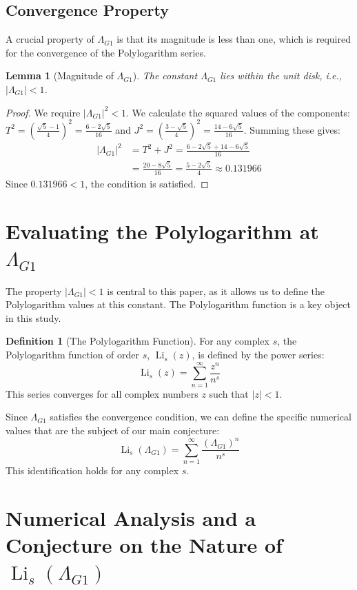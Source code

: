 \documentclass{amsart}
\theoremstyle{plain}
\newtheorem{lemma}[theorem]{Lemma}
\theoremstyle{definition}
\newtheorem{definition}[theorem]{Definition}
\theoremstyle{remark}
\DeclareMathOperator{\Li}{Li}
\newcommand{\LambdaG}{\Lambda_{G1}}
\begin{document}
\subsection{Convergence Property}
A crucial property of $\LambdaG$ is that its magnitude is less than one, which is required for the convergence of the Polylogarithm series.
\begin{lemma}[Magnitude of $\LambdaG$]
\label{lem:convergence}
The constant $\LambdaG$ lies within the unit disk, i.e., $|\LambdaG| < 1$.
\end{lemma}
\begin{proof}
We require $|\LambdaG|^2 < 1$. We calculate the squared values of the components: $T^2 = \left(\frac{\sqrt{5}-1}{4}\right)^2 = \frac{6-2\sqrt{5}}{16}$ and $J^2 = \left(\frac{3-\sqrt{5}}{4}\right)^2 = \frac{14-6\sqrt{5}}{16}$. Summing these gives:
\begin{align*}
    |\LambdaG|^2 &= T^2+J^2 = \frac{6-2\sqrt{5} + 14-6\sqrt{5}}{16} \\
                 &= \frac{20-8\sqrt{5}}{16} = \frac{5-2\sqrt{5}}{4} \approx 0.131966
\end{align*}
Since $0.131966 < 1$, the condition is satisfied.
\end{proof}

\section{Evaluating the Polylogarithm at \texorpdfstring{$\LambdaG$}{Lambda\_G1}}
The property $|\LambdaG| < 1$ is central to this paper, as it allows us to define the Polylogarithm values at this constant. The Polylogarithm function is a key object in this study.
\begin{definition}[The Polylogarithm Function]
For any complex $s$, the Polylogarithm function of order $s$, $\Li_s(z)$, is defined by the power series:
\[ \Li_s(z) = \sum_{n=1}^{\infty} \frac{z^n}{n^s} \]
This series converges for all complex numbers $z$ such that $|z|<1$.
\end{definition}

Since $\LambdaG$ satisfies the convergence condition, we can define the specific numerical values that are the subject of our main conjecture:
\[ \Li_s(\LambdaG) = \sum_{n=1}^{\infty} \frac{(\LambdaG)^{n}}{n^s} \]
This identification holds for any complex $s$.

\section{Numerical Analysis and a Conjecture on the Nature of \texorpdfstring{$\Li_s(\LambdaG)$}{Li\_s(Lambda\_G1)}}
\end{document}
